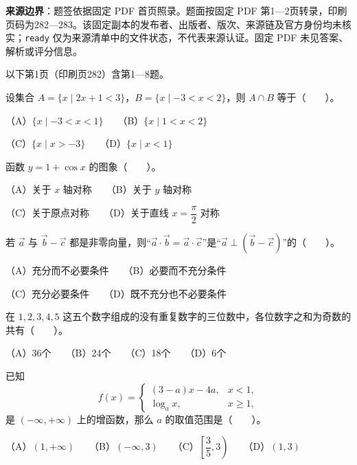 

\begin{gktip}
\textbf{来源边界}：题签依据固定 PDF 首页照录。题面按固定 PDF 第1—2页转录，印刷页码为282—283。该固定副本的发布者、出版者、版次、来源链及官方身份均未核实；\texttt{ready} 仅为来源清单中的文件状态，不代表来源认证。固定 PDF 未见答案、解析或评分信息。
\end{gktip}


\begin{gktip}
以下第1页（印刷页282）含第1—8题。
\end{gktip}

\begin{question}
设集合 $A=\{x\mid 2x+1<3\}$，$B=\{x\mid -3<x<2\}$，则 $A\cap B$ 等于\mbox{（　　）}。

（A）$\{x\mid -3<x<1\}$　　（B）$\{x\mid 1<x<2\}$

（C）$\{x\mid x>-3\}$　　（D）$\{x\mid x<1\}$

\end{question}
\begin{question}
函数 $y=1+\cos x$ 的图象\mbox{（　　）}。

（A）关于 $x$ 轴对称　　（B）关于 $y$ 轴对称

（C）关于原点对称　　（D）关于直线 $x=\dfrac{\pi}{2}$ 对称

\end{question}
\begin{question}
若 $\vec a$ 与 $\vec b-\vec c$ 都是非零向量，则“$\vec a\cdot\vec b=\vec a\cdot\vec c$”是“$\vec a\perp(\vec b-\vec c)$”的\mbox{（　　）}。

（A）充分而不必要条件　　（B）必要而不充分条件

（C）充分必要条件　　（D）既不充分也不必要条件

\end{question}
\begin{question}
在 $1,2,3,4,5$ 这五个数字组成的没有重复数字的三位数中，各位数字之和为奇数的共有\mbox{（　　）}。

（A）36个　　（B）24个　　（C）18个　　（D）6个

\end{question}
\begin{question}
已知
\nopagebreak[4]
\[
f(x)=\begin{cases}
(3-a)x-4a, & x<1,\\
\log_a x, & x\ge 1,
\end{cases}
\]
是 $(-\infty,+\infty)$ 上的增函数，那么 $a$ 的取值范围是\mbox{（　　）}。

（A）$(1,+\infty)$　　（B）$(-\infty,3)$　　（C）$\left[\dfrac35,3\right)$　　（D）$(1,3)$

\end{question}

